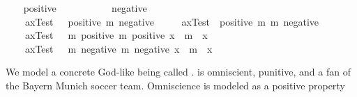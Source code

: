 \begin{isabellebody}
\begin{isamarkuptext}
\end{isamarkuptext}%
\isamarkuptrue%
\ \ \isamarkupfalse%
\ positive\ {\isacharcolon}{\isacharcolon}\ {\isachardoublequoteopen}{\isacharparenleft}{\isasymmu}\ {\isasymRightarrow}\ {\isasymsigma}{\isacharparenright}\ {\isasymRightarrow}\ {\isasymsigma}{\isachardoublequoteclose}\ \isanewline
\ \ \isamarkupfalse%
\ negative\ {\isacharcolon}{\isacharcolon}\ {\isachardoublequoteopen}{\isacharparenleft}{\isasymmu}\ {\isasymRightarrow}\ {\isasymsigma}{\isacharparenright}\ {\isasymRightarrow}\ {\isasymsigma}{\isachardoublequoteclose}\ \isanewline
\isanewline
\ \ \isamarkupfalse%
\ \isanewline
\ \ \ \ axTest{}\ \ {\isacharcolon}\ {\isachardoublequoteopen}{\isacharbrackleft}positive{\isacharparenleft}{\isasymphi}{\isacharparenright}\ m{\isasymor}\ negative{\isacharparenleft}{\isasymphi}{\isacharparenright}{\isacharbrackright}{\isachardoublequoteclose}\ \isanewline
\ \ \ \ axTest{}\ {\isacharcolon}\ {\isachardoublequoteopen}{\isacharbrackleft}positive{\isacharparenleft}{\isasymphi}{\isacharparenright}\ m{\isasymequiv}\ m{\isasymnot}\ {\isacharparenleft}negative{\isacharparenleft}{\isasymphi}{\isacharparenright}{\isacharparenright}{\isacharbrackright}{\isachardoublequoteclose}\ \isanewline
\ \ \ \ axTest{}\ \ {\isacharcolon}\ {\isachardoublequoteopen}{\isacharbrackleft}m{\isasymnot}\ {\isacharparenleft}positive{\isacharparenleft}{\isasymphi}{\isacharparenright}{\isacharparenright}\ m{\isasymequiv}\ {\isacharparenleft}positive\ {\isacharparenleft}{\isasymlambda}x\ {\isachardot}\ m{\isasymnot}\ {\isacharparenleft}{\isasymphi}\ x{\isacharparenright}{\isacharparenright}{\isacharparenright}{\isacharbrackright}{\isachardoublequoteclose}\ \isanewline
\ \ \ \ axTest{}\ \ {\isacharcolon}\ {\isachardoublequoteopen}{\isacharbrackleft}m{\isasymnot}\ {\isacharparenleft}negative{\isacharparenleft}{\isasymphi}{\isacharparenright}{\isacharparenright}\ m{\isasymequiv}\ {\isacharparenleft}negative\ {\isacharparenleft}{\isasymlambda}x\ {\isachardot}\ m{\isasymnot}\ {\isacharparenleft}{\isasymphi}\ x{\isacharparenright}{\isacharparenright}{\isacharparenright}{\isacharbrackright}{\isachardoublequoteclose}%
\begin{isamarkuptext}%
We model a concrete God-like being called .  is omniscient, 
punitive, and a fan of the Bayern Munich soccer team. Omniscience is modeled as a positive property 

\end{isamarkuptext}
\end{isabellebody}
